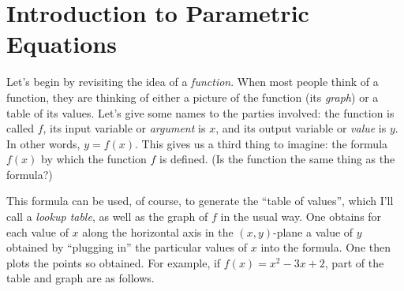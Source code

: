 \documentclass[justified]{tufte-handout}
\begin{document}
\section{Introduction to Parametric Equations}

Let's begin by revisiting the idea of a \emph{function}. When most people think of a function, they are thinking of either a picture of the function (its \emph{graph}) or a table of its values. Let's give some names to the parties involved: the function is called $f$, its input variable or \emph{argument} is $x$, and its output variable or \emph{value} is $y$. In other words, $y = f(x)$. This gives us a third thing to imagine: the formula $f(x)$ by which the function $f$ is defined. (Is the function the same thing as the formula?)

This formula can be used, of course, to generate the ``table of values'', which I'll call a \emph{lookup table}, as well as the graph of $f$ in the usual way. One obtains for each value of $x$ along the horizontal axis in the $(x,y)$-plane a value of $y$ obtained by ``plugging in'' the particular values of $x$ into the formula. One then plots the points so obtained. For example, if $f(x) = x^2 - 3x + 2$, part of the table and graph are as follows.
\end{document}
